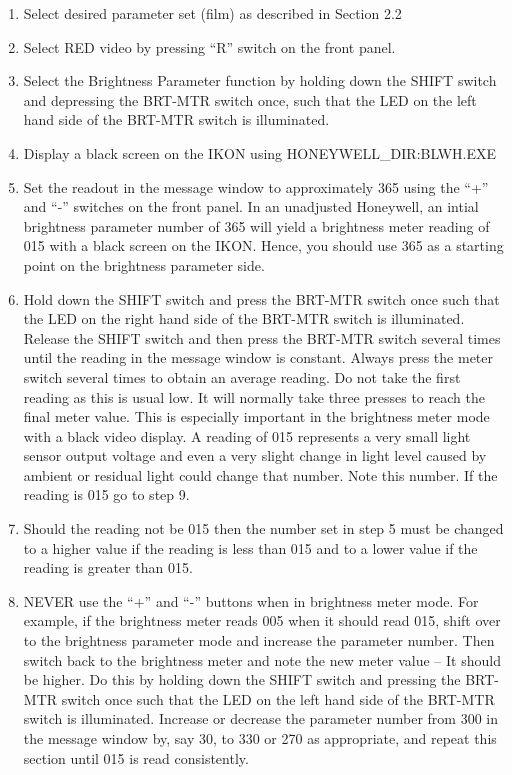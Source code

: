 \begin{enumerate}

\item Select desired parameter set (film) as described in Section 2.2

\item Select RED video by pressing ``R'' switch on the front panel.
    
\item Select the Brightness Parameter function by holding down the SHIFT 
switch and depressing the BRT-MTR switch once, such that the LED on
the left hand side of the BRT-MTR switch is illuminated.

\item Display a black screen on the IKON using HONEYWELL\_DIR:BLWH.EXE

\item Set the readout in the message window to approximately 365 using the
``+'' and ``-''  switches on the front panel.
In an unadjusted Honeywell,
an intial brightness parameter number of 365 will yield a brightness meter
reading of 015 with a black screen on the IKON. Hence, you should use 365 
as a starting point on the brightness parameter side.          

\item Hold down the SHIFT switch and press the BRT-MTR switch once such
that the LED on the right hand side of the BRT-MTR switch is 
illuminated.  Release the SHIFT switch and then press the BRT-MTR switch
several times until the reading in the message window is constant.
Always press the meter switch several times to obtain an average reading.
Do not take the first reading as this is usual low. It will normally
take three presses to reach the final meter value. This is especially important 
in the brightness meter mode with a black video display. A reading of
015 represents a very small light sensor output voltage and even a very 
slight change in light level caused by ambient or residual light could change
that number.
Note this number.  If the reading is 015 go to step 9.

\item Should the reading not be 015 then the number set in step 5 must
be changed to a higher value if the reading is less than 015 and to a 
lower value if the reading is greater than 015.

\item 
NEVER use the ``+'' and ``-'' buttons when in brightness meter mode.
For example, if the brightness meter reads 005 when it should read 015, shift
over to the brightness parameter mode and increase the parameter number. Then switch
back to the brightness meter and note the new meter value -- It should be higher.
Do this by holding down the SHIFT switch and pressing the BRT-MTR switch
once such that the LED on the left hand side of the BRT-MTR switch is
illuminated.  
Increase or decrease the parameter number from 300 in the message
window by, say 30, to 330 or 270 as appropriate, and repeat this 
section until 015 is read consistently. 


\end{enumerate}
